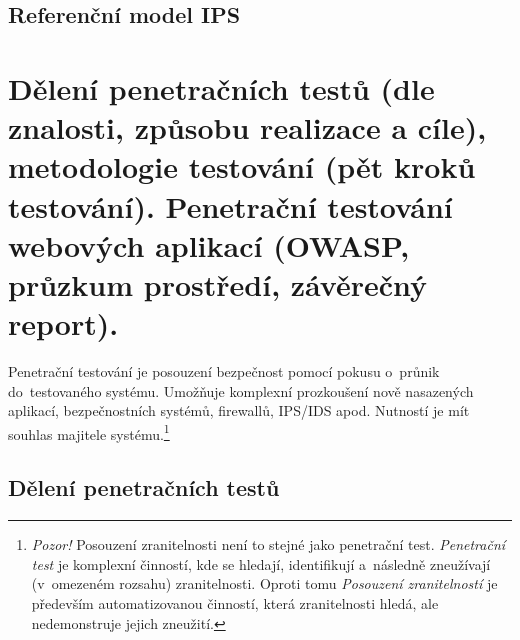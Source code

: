 \subsection{Referenční model IPS}

\begin{figure}[ht]
\centering
{}
\end{figure}

\clearpage

\section{Dělení penetračních testů (dle znalosti, způsobu realizace a cíle), metodologie testování (pět kroků testování). Penetrační testování webových aplikací (OWASP, průzkum prostředí, závěrečný report).}

Penetrační testování je posouzení bezpečnost pomocí pokusu o~průnik do~testovaného systému. Umožňuje komplexní prozkoušení nově nasazených aplikací, bezpečnostních systémů, firewallů, IPS/IDS apod. Nutností je mít souhlas majitele systému.\footnote{\textit{Pozor!} Posouzení zranitelnosti není to stejné jako penetrační test. \textit{Penetrační test} je komplexní činností, kde se hledají, identifikují a~následně zneužívají (v~omezeném rozsahu) zranitelnosti. Oproti tomu \textit{Posouzení zranitelností} je především automatizovanou činností, která zranitelnosti hledá, ale nedemonstruje jejich zneužití.}

\subsection{Dělení penetračních testů}

